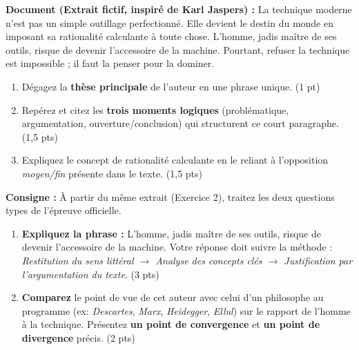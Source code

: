 \documentclass[11pt]{article}
\begin{document}
\begin{exercice}
\textbf{Document (Extrait fictif, inspiré de Karl Jaspers) :}
\og La technique moderne n'est pas un simple outillage perfectionné. Elle devient le destin du monde en imposant sa rationalité calculante à toute chose. L'homme, jadis maître de ses outils, risque de devenir l'accessoire de la machine. Pourtant, refuser la technique est impossible ; il faut la penser pour la dominer. \fg{}

\begin{enumerate}
    \item Dégagez la \textbf{thèse principale} de l'auteur en une phrase unique. \hfill (1 pt)
    \item Repérez et citez les \textbf{trois moments logiques} (problématique, argumentation, ouverture/conclusion) qui structurent ce court paragraphe. \hfill (1,5 pts)
    \item Expliquez le concept de \og rationalité calculante \fg{} en le reliant à l'opposition \textit{moyen/fin} présente dans le texte. \hfill (1,5 pts)
\end{enumerate}
\end{exercice}

\begin{exercice}
\textbf{Consigne :} À partir du même extrait (Exercice 2), traitez les deux questions types de l'épreuve officielle.
\begin{enumerate}
    \item \textbf{Expliquez la phrase :} \og L'homme, jadis maître de ses outils, risque de devenir l'accessoire de la machine. \fg{} Votre réponse doit suivre la méthode : \textit{Restitution du sens littéral $\rightarrow$ Analyse des concepts clés $\rightarrow$ Justification par l'argumentation du texte}. \hfill (3 pts)
    \item \textbf{Comparez} le point de vue de cet auteur avec celui d'un philosophe au programme (ex: \textit{Descartes}, \textit{Marx}, \textit{Heidegger}, \textit{Ellul}) sur le rapport de l'homme à la technique. Présentez \textbf{un point de convergence} et \textbf{un point de divergence} précis. \hfill (2 pts)
\end{enumerate}
\end{exercice}
\end{document}
